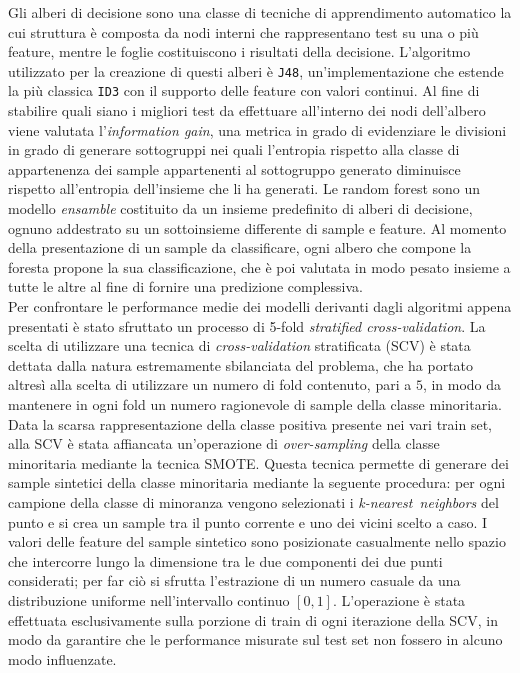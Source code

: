 Gli alberi di decisione sono una classe di tecniche di apprendimento automatico la cui struttura è composta da nodi interni che rappresentano test su una o più feature, mentre le foglie costituiscono i risultati della decisione.
L'algoritmo utilizzato per la creazione di questi alberi è \texttt{J48}, un'implementazione che estende la più classica \texttt{ID3} con il supporto delle feature con valori continui.
Al fine di stabilire quali siano i migliori test da effettuare all'interno dei nodi dell'albero viene valutata l'\textit{information gain}, una metrica in grado di evidenziare le divisioni in grado di generare sottogruppi nei quali l'entropia rispetto alla classe di appartenenza dei sample appartenenti al sottogruppo generato diminuisce rispetto all'entropia dell'insieme che li ha generati.
Le random forest sono un modello \textit{ensamble} costituito da un insieme predefinito di alberi di decisione, ognuno addestrato su un sottoinsieme differente di sample e feature.
Al momento della presentazione di un sample da classificare, ogni albero che compone la foresta propone la sua classificazione, che è poi valutata in modo pesato insieme a tutte le altre al fine di fornire una predizione complessiva.\\
Per confrontare le performance medie dei modelli derivanti dagli algoritmi appena presentati è stato sfruttato un processo di 5-fold \textit{stratified cross-validation}.
La scelta di utilizzare una tecnica di \textit{cross-validation} stratificata (SCV) è stata dettata dalla natura estremamente sbilanciata del problema, che ha portato altresì alla scelta di utilizzare un numero di fold contenuto, pari a $5$, in modo da mantenere in ogni fold un numero ragionevole di sample della classe minoritaria.
Data la scarsa rappresentazione della classe positiva presente nei vari train set, alla SCV è stata affiancata un'operazione di \textit{over-sampling} della classe minoritaria mediante la tecnica SMOTE. 
Questa tecnica permette di generare dei sample sintetici della classe minoritaria mediante la seguente procedura: per ogni campione della classe di minoranza vengono selezionati i \textit{k-nearest neighbors} del punto e si crea un sample tra il punto corrente e uno dei vicini scelto a caso. 
I valori delle feature del sample sintetico sono posizionate casualmente nello spazio che intercorre lungo la dimensione tra le due componenti dei due punti considerati; per far ciò si sfrutta l'estrazione di un numero casuale da una distribuzione uniforme nell'intervallo continuo $[0, 1]$.
L'operazione è stata effettuata esclusivamente sulla porzione di train di ogni iterazione della SCV, in modo da garantire che le performance misurate sul test set non fossero in alcuno modo influenzate.
